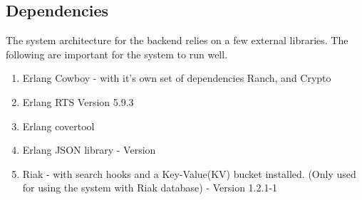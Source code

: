 \newpage
\subsection {Dependencies}

The system architecture for the backend relies on a few external libraries. The following are important for the system to run well. 

\begin {enumerate}
\item Erlang Cowboy - with it's own set of dependencies Ranch, and Crypto
\item Erlang RTS Version 5.9.3
\item Erlang covertool
\item Erlang JSON library - Version 
\item Riak - with search hooks and a Key-Value(KV) bucket installed.
		(Only used for using the system with Riak database) - Version 1.2.1-1
\end {enumerate}
